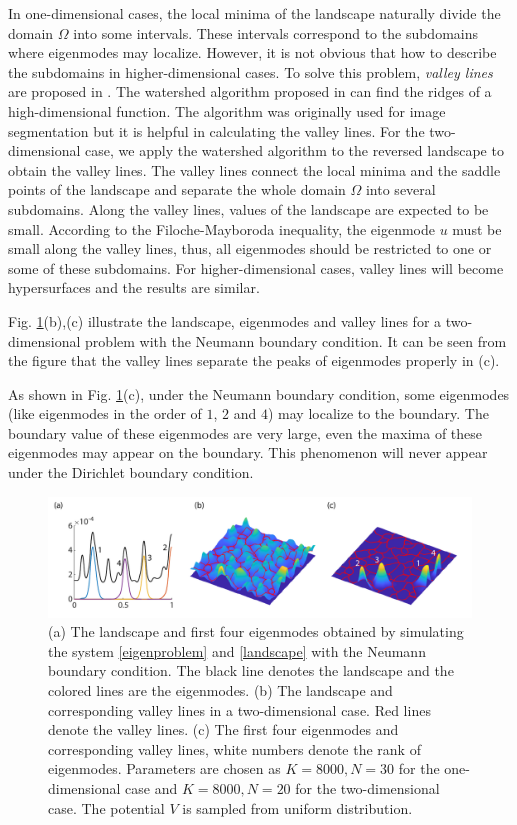 \documentclass[a4paper,11pt]{article}
\begin{document}
In one-dimensional cases, the local minima of the landscape naturally divide the domain $\Omega$ into some intervals. These intervals correspond to the subdomains where eigenmodes may localize. However, it is not obvious that how to describe the subdomains in higher-dimensional cases. To solve this problem, \emph{valley lines} are proposed in \cite{filoche2012universal}. The watershed algorithm proposed in \cite{Soille1990Determining} can find the ridges of a high-dimensional function. The algorithm was originally used for image segmentation but it is helpful in calculating the valley lines. For the two-dimensional case, we apply the watershed algorithm to the reversed landscape to obtain the valley lines. The valley lines connect the local minima and the saddle points of the landscape and separate the whole domain $\Omega$ into several subdomains. Along the valley lines, values of the landscape are expected to be small. According to the Filoche-Mayboroda inequality, the eigenmode $u$ must be small along the valley lines, thus, all eigenmodes should be restricted to one or some of these subdomains. For higher-dimensional cases, valley lines will become hypersurfaces and the results are similar.

Fig. \ref{fig1}(b),(c) illustrate the landscape, eigenmodes and valley lines for a two-dimensional problem with the Neumann boundary condition. It can be seen from the figure that the valley lines separate the peaks of eigenmodes properly in (c).

As shown in Fig. \ref{fig1}(c), under the Neumann boundary condition, some eigenmodes (like eigenmodes in the order of $1$, $2$ and $4$) may localize to the boundary. The boundary value of these eigenmodes are very large, even the maxima of these eigenmodes may appear on the boundary. This phenomenon will never appear under the Dirichlet boundary condition.

\begin{figure}
\centering
\includegraphics[width=\linewidth]{Fig1}
\caption{(a) The landscape and first four eigenmodes obtained by simulating the system \eqref{eigenproblem} and \eqref{landscape} with the Neumann boundary condition. The black line denotes the landscape and the colored lines are the eigenmodes. (b) The landscape and corresponding valley lines in a two-dimensional case. Red lines denote the valley lines. (c) The first four eigenmodes and corresponding valley lines, white numbers denote the rank of eigenmodes. Parameters are chosen as $K = 8000, N = 30$ for the one-dimensional case and $K = 8000, N = 20$ for the two-dimensional case. The potential $V$ is sampled from uniform distribution. }
\label{fig1}
\end{figure}
\end{document}
